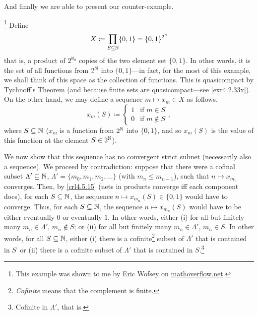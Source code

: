 And finally we are able to present our counter-example.
\begin{exm}\footnote{This example was shown to me by Eric Wofsey on \href{http://mathoverflow.net/questions/210947/a-quasicompact-space-with-a-net-that-contains-no-convergent-strict-subnet}{mathoverflow.net}.}
Define
\begin{equation}
X\coloneqq \prod _{S\subseteq \mathbb{N}}\{ 0,1\} =\{ 0,1\} ^{2^{\mathbb{N}}}
\end{equation}
that is, a product of $2^{\aleph _0}$ copies of the two element set $\{ 0,1\}$.  In other words, it is the set of all functions from $2^{\mathbb{N}}$ into $\{ 0,1\}$---in fact, for the most of this example, we shall think of this space as the collection of functions.   This is quasicompact by Tychnoff's Theorem (and because finite sets are quasicompact---see \cref{exr4.2.33x}).  On the other hand, we may define a sequence $m\mapsto x_m\in X$ as follows.
\begin{equation}
x_m(S)\coloneqq \begin{cases}1 & \text{if }m\in S \\ 0 & \text{if }m\notin S\end{cases},
\end{equation}
where $S\subseteq \mathbb{N}$ ($x_m$ is a function from $2^{\mathbb{N}}$ into $\{ 0,1\}$, and so $x_m(S)$ is the value of this function at the element $S\in 2^{\mathbb{N}}$).

We now show that this sequence has no convergent strict subnet (necessarily also a sequence).  We proceed by contradiction:  suppose that there were a cofinal subset $\Lambda '\subseteq \mathbb{N}$, $\Lambda '=\{ m_0,m_1,m_2,\ldots \}$ (with $m_n\leq m_{n+1}$), such that $n\mapsto x_{m_n}$ converges.  Then, by \cref{crl4.5.15} (nets in products converge iff each component does), for each $S\subseteq \mathbb{N}$, the sequence $n\mapsto x_{m_n}(S)\in \{ 0,1\}$ would have to converge.  Thus, for each $S\subseteq \mathbb{N}$, the sequence $n\mapsto x_{m_n}(S)$ would have to be either eventually $0$ or eventually $1$.  In other words, either (i) for all but finitely many $m_n\in \Lambda '$, $m_n\notin S$;  or (ii) for all but finitely many $m_n\in \Lambda '$, $m_n\in S$.  In other words, for all $S\subseteq \mathbb{N}$, either (i) there is a cofinite\footnote{\emph{Cofinite} means that the complement is finite.} subset of $\Lambda '$ that is contained in $S^{\comp}$ or (ii) there is a cofinite subset of $\Lambda '$ that is contained in $S$.\footnote{Cofinite in $\Lambda '$, that is.}


\end{exm}
